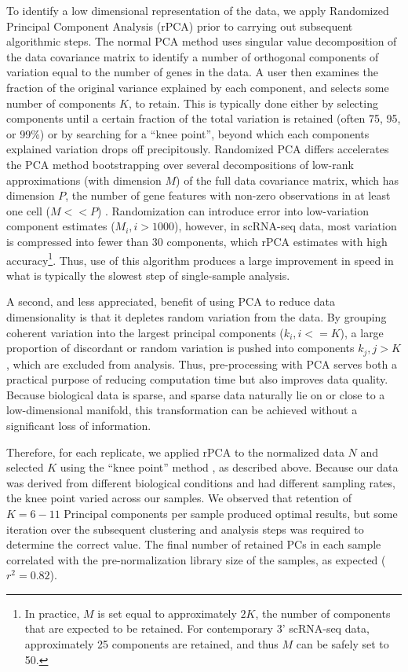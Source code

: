 To identify a low dimensional representation of the data, we apply Randomized Principal Component Analysis (rPCA) \citep{Halko2009,Rokhlin2009} prior to carrying out subsequent algorithmic steps. %
The normal PCA method uses singular value decomposition of the data covariance matrix to identify a number of orthogonal components of variation equal to the number of genes in the data. 
A user then examines the fraction of the original variance explained by each component, and selects some number of components $K$, to retain. This is typically done either by selecting components until a certain fraction of the total variation is retained (often 75, 95, or 99\%) or by searching for a ``knee point'', beyond which each components explained variation drops off precipitously. %
Randomized PCA differs accelerates the PCA method bootstrapping over several decompositions of low-rank approximations (with dimension $M$) of the full data covariance matrix, which has dimension $P$, the number of gene features with non-zero observations in at least one cell ($M << P$) \citep{Halko2009}.
Randomization can introduce error into low-variation component estimates ($M_i, i > 1000$), however, in scRNA-seq data, most variation is compressed into fewer than 30 components, which rPCA estimates with high accuracy\footnote{In practice, $M$ is set equal to approximately $2K$, the number of components that are expected to be retained. 
For contemporary 3' scRNA-seq data, approximately 25 components are retained, and thus $M$ can be safely set to 50.}.
Thus, use of this algorithm produces a large improvement in speed in what is typically the slowest step of single-sample analysis.  %

A second, and less appreciated, benefit of using PCA to reduce data dimensionality is that it depletes random variation from the data.
By grouping coherent variation into the largest principal components ($k_i, i <= K$), a large proportion of discordant or random variation is pushed into components $k_j, j > K$, which are excluded from analysis. 
Thus, pre-processing with PCA serves both a practical purpose of reducing computation time but also improves data quality.
Because biological data is sparse, and sparse data naturally lie on or close to a low-dimensional manifold, this transformation can be achieved without a significant loss of information. 

Therefore, for each replicate, we applied rPCA to the normalized data $N$ and selected $K$ using the ``knee point'' method \citep{Valle1999}, as described above. 
Because our data was derived from different biological conditions and had different sampling rates, the knee point varied across our samples.
We observed that retention of  $K=6-11$ Principal components per sample produced optimal results, but some iteration over the subsequent clustering and analysis steps was required to determine the correct value. 
The final number of retained PCs in each sample correlated with the pre-normalization library size of the samples, as expected ($r^2 = 0.82$).

